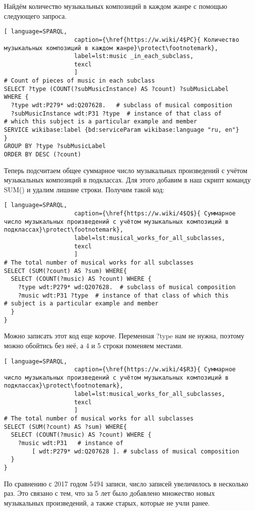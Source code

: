 Найдём количество музыкальных композиций в каждом жанре с помощью следующего запроса.

\begin{lstlisting}[ language=SPARQL,
                    caption={\href{https://w.wiki/4$PC}{ Количество музыкальных композиций в каждом жанре}\protect\footnotemark},
                    label=lst:music _in_each_subclass,
                    texcl 
                    ]
# Count of pieces of music in each subclass
SELECT ?type (COUNT(?subMusicInstance) AS ?count) ?subMusicLabel 
WHERE {
  ?type wdt:P279* wd:Q207628.	# subclass of musical composition
  ?subMusicInstance wdt:P31 ?type  # instance of that class of
# which this subject is a particular example and member
SERVICE wikibase:label {bd:serviceParam wikibase:language "ru, en"}
}
GROUP BY ?type ?subMusicLabel
ORDER BY DESC (?count)
\end{lstlisting}%

Теперь подсчитаем общее суммарное число музыкальных произведений с учётом музыкальных композиций в подклассах. Для этого добавим в наш скрипт команду SUM() и удалим лишние строки. Получим такой код:

\begin{lstlisting}[ language=SPARQL,
                    caption={\href{https://w.wiki/4$Q$}{ Суммарное число музыкальных произведений с учётом музыкальных композиций в подклассах}\protect\footnotemark},
                    label=lst:musical_works_for_all_subclasses,
                    texcl 
                    ]
# The total number of musical works for all subclasses 
SELECT (SUM(?count) AS ?sum) WHERE{
  SELECT (COUNT(?music) AS ?count) WHERE {
    ?type wdt:P279* wd:Q207628.  # subclass of musical composition
    ?music wdt:P31 ?type  # instance of that class of which this
# subject is a particular example and member
  }
}
\end{lstlisting}%

Можно записать этот код еще короче. Переменная ?type нам не нужна, поэтому можно обойтись без неё, а 4 и 5 строки поменяем местами.

\begin{lstlisting}[ language=SPARQL,
                    caption={\href{https://w.wiki/4$R3}{ Суммарное число музыкальных произведений с учётом музыкальных композиций в подклассах}\protect\footnotemark},
                    label=lst:musical_works_for_all_subclasses,
                    texcl 
                    ]
# The total number of musical works for all subclasses 
SELECT (SUM(?count) AS ?sum) WHERE{
  SELECT (COUNT(?music) AS ?count) WHERE {
    ?music wdt:P31   # instance of
        [ wdt:P279* wd:Q207628 ]. # subclass of musical composition
  }
}
\end{lstlisting}%

По сравнению с 2017 годом 5494 записи, число записей увеличилось в несколько раз. Это связано с тем, что за 5 лет было добавлено множество новых музыкальных произведений, а также старых, которые не учли ранее.
